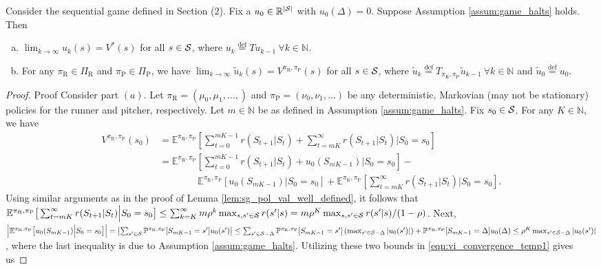 \documentclass[opre,dblanonrev]{informs4}
\newcommand{\defeq}{\stackrel{\text{def}}{=}}
\newcommand{\abs}[1]{\left\lvert#1\right\rvert}
\begin{document}
\begin{APPENDICES}
       
          \begin{theorem}
           \label{lem:vi_convergence}
           Consider the sequential game defined in Section (2). Fix a $u_0 \in \mathbb{R}^{\abs{\cal S}}$ with $u_0(\Delta) = 0$. Suppose Assumption \ref{assum:game_halts} holds. Then
           \begin{enumerate}[(a)]
               \item $\lim_{k \to \infty}u_k(s) = V^*(s)$ for all $s \in {\cal S}$, where $u_{k} \defeq Tu_{k-1} \ \forall k \in \mathbb{N}$.
               \item For any $\pi_\text{R} \in \Pi_\text{R}$ and $\pi_\text{P} \in \Pi_\text{P}$, we have $\lim_{k \to \infty}\tilde u_k(s) = V^{\pi_\text{R},\pi_\text{P}}(s)$ for all $s \in {\cal S}$, where $\tilde u_k \defeq T_{\pi_\text{R},\pi_\text{P}}\tilde u_{k-1} \ \forall k \in \mathbb{N}$ and $\tilde u_0 \defeq u_0$.
           \end{enumerate}
       \end{theorem}
       \begin{proof}{Proof}       
           Consider part $(a)$.  Let $\pi_\text{R} = (\mu_0,\mu_1,\ldots,)$ and $\pi_\text{P} = (\nu_0,\nu_1,\ldots)$ be any  deterministic, Markovian (may not be stationary) policies for the runner and pitcher, respectively. Let $m \in \mathbb{N}$ be as defined in Assumption \ref{assum:game_halts}. Fix $s_0 \in {\cal S}$. For any $K \in \mathbb{N}$, we have
           \begingroup
           \allowdisplaybreaks
           \begin{align}
           \nonumber
               V^{\pi_\text{R},\pi_\text{P}}(s_0) &= \mathbb{E}^{\pi_\text{R},\pi_\text{P}}\left[\sum_{t=0}^{mK-1} r(S_{t+1}|S_t) + \sum_{t=mK}^\infty r(S_{t+1}|S_t) \Big| S_0 = s_0\right]\\
               \nonumber
               &= \mathbb{E}^{\pi_\text{R},\pi_\text{P}}\left[\sum_{t=0}^{mK-1} r(S_{t+1}|S_t) + u_0(S_{mK-1}) \Big| S_0 = s_0\right] -\\           \label{eqn:vi_convergence_temp1}
               &\qquad \qquad \mathbb{E}^{\pi_\text{R},\pi_\text{P}}\left[ u_0(S_{mK-1})\Big| S_0 = s_0\right] + \mathbb{E}^{\pi_\text{R},\pi_\text{P}}\left[\sum_{t=mK}^\infty r(S_{t+1}|S_t) \Big| S_0 = s_0\right].
           \end{align}
           \endgroup
           Using similar arguments as in the proof of Lemma \ref{lem:sg_pol_val_well_defined}, it follows that $\mathbb{E}^{\pi_\text{R},\pi_\text{P}}\big[\sum_{t=mK}^\infty r(S_{t+1}|S_t) \Big| S_0 = s_0\big] \leq \sum_{k=K}^\infty m \rho^k \max_{s,s' \in {\cal S}}r(s'|s) = m\rho^K\max_{s,s' \in {\cal S}}r(s'|s)/(1-\rho)$. Next, $\abs{\mathbb{E}^{\pi_\text{R},\pi_\text{P}}\big[ u_0(S_{mK-1})\Big| S_0 = s_0\big]} = \abs{\sum_{s' \in {\cal S}}\mathbb{P}^{\pi_\text{R},\pi_\text{P}}[S_{mK-1}=s']u_0(s')} \leq \sum_{s' \in {\cal S}-\Delta}\mathbb{P}^{\pi_\text{R},\pi_\text{P}}[S_{mK-1}=s'] \left(\max_{s' \in {\cal S}-\Delta}\abs{u_0(s')}\right) + \mathbb{P}^{\pi_\text{R},\pi_\text{P}}[S_{mK-1}=\Delta]u_0(\Delta) \leq \rho^K \max_{s' \in {\cal S}-\Delta}\abs{u_0(s')}$, where the last inequality is due to Assumption \ref{assum:game_halts}. Utilizing these two bounds in \eqref{eqn:vi_convergence_temp1} gives us

\end{proof}
\end{APPENDICES}
\end{document}

